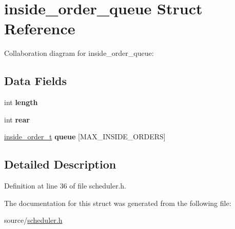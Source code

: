 \hypertarget{structinside__order__queue}{}\section{inside\+\_\+order\+\_\+queue Struct Reference}
\label{structinside__order__queue}


Collaboration diagram for inside\+\_\+order\+\_\+queue\+:
\subsection*{Data Fields}
\begin{DoxyCompactItemize}
\item 
int {\bfseries length}\hypertarget{structinside__order__queue_af25818967b7fcb1153ca2f3b0680526f}{}\label{structinside__order__queue_af25818967b7fcb1153ca2f3b0680526f}

\item 
int {\bfseries rear}\hypertarget{structinside__order__queue_ab8e16f2ab4d7e5563e98981b4f5f0d54}{}\label{structinside__order__queue_ab8e16f2ab4d7e5563e98981b4f5f0d54}

\item 
\hyperlink{structinside__order}{inside\+\_\+order\+\_\+t} {\bfseries queue} \mbox{[}M\+A\+X\+\_\+\+I\+N\+S\+I\+D\+E\+\_\+\+O\+R\+D\+E\+RS\mbox{]}\hypertarget{structinside__order__queue_a4dd512cf1ce8c0f4d5ff0b8cacbfc6cd}{}\label{structinside__order__queue_a4dd512cf1ce8c0f4d5ff0b8cacbfc6cd}

\end{DoxyCompactItemize}


\subsection{Detailed Description}


Definition at line 36 of file scheduler.\+h.



The documentation for this struct was generated from the following file\+:\begin{DoxyCompactItemize}
\item 
source/\hyperlink{scheduler_8h}{scheduler.\+h}\end{DoxyCompactItemize}
